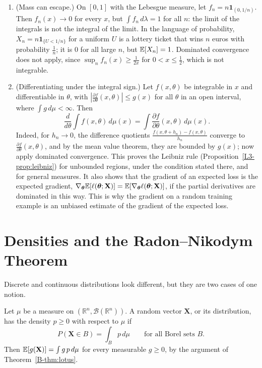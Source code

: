 \begin{example}\label{B-ex:escaping-mass}
    \begin{enumerate}
        \item (Mass can escape.) On $[0, 1]$ with the Lebesgue measure, let $f_n = n\mathbf{1}_{(0, 1/n)}$. Then $f_n(x) \to 0$ for every $x$, but $\int f_n\, d\lambda = 1$ for all $n$: the limit of the integrals is not the integral of the limit. In the language of probability, $X_n = n\mathbf{1}_{\{U < 1/n\}}$ for a uniform $U$ is a lottery ticket that wins $n$ euros with probability $\frac{1}{n}$; it is $0$ for all large $n$, but $\mathbb{E}[X_n] = 1$. Dominated convergence does not apply, since $\sup_n f_n(x) \geq \frac{1}{2x}$ for $0 < x \leq \frac{1}{2}$, which is not integrable.
        \item (Differentiating under the integral sign.) Let $f(x, \theta)$ be integrable in $x$ and differentiable in $\theta$, with $|\frac{\partial f}{\partial\theta}(x, \theta)| \leq g(x)$ for all $\theta$ in an open interval, where $\int g\, d\mu < \infty$. Then
        \[\frac{d}{d\theta}\int f(x, \theta)\, d\mu(x) = \int \frac{\partial f}{\partial\theta}(x, \theta)\, d\mu(x).\]
        Indeed, for $h_n \to 0$, the difference quotients $\frac{f(x, \theta + h_n) - f(x, \theta)}{h_n}$ converge to $\frac{\partial f}{\partial\theta}(x, \theta)$, and by the mean value theorem, they are bounded by $g(x)$; now apply dominated convergence. This proves the Leibniz rule (Proposition~\ref{L3-prop:leibniz}) for unbounded regions, under the condition stated there, and for general measures. It also shows that the gradient of an expected loss is the expected gradient, $\nabla_{\boldsymbol{\theta}}\mathbb{E}[\ell(\boldsymbol{\theta}; \mathbf{X})] = \mathbb{E}[\nabla_{\boldsymbol{\theta}}\ell(\boldsymbol{\theta}; \mathbf{X})]$, if the partial derivatives are dominated in this way. This is why the gradient on a random training example is an unbiased estimate of the gradient of the expected loss.
    \end{enumerate}
\end{example}

\section{Densities and the Radon--Nikodym Theorem}\label{B-sec:densities}

Discrete and continuous distributions look different, but they are two cases of one notion.

\begin{definition}\label{B-def:density}
    Let $\mu$ be a measure on $(\mathbb{R}^n, \mathcal{B}(\mathbb{R}^n))$. A random vector $\mathbf{X}$, or its distribution, has the density $p \geq 0$ with respect to $\mu$ if
    \[P(\mathbf{X} \in B) = \int_B p\, d\mu \qquad \text{for all Borel sets } B.\]
    Then $\mathbb{E}[g(\mathbf{X})] = \int g\,p\, d\mu$ for every measurable $g \geq 0$, by the argument of Theorem~\ref{B-thm:lotus}.
\end{definition}

